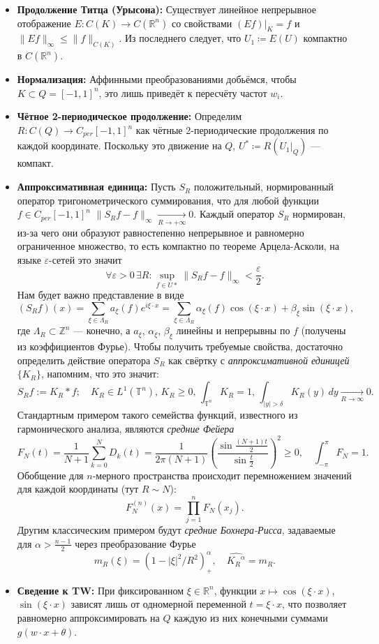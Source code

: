 \documentclass[../NDCNNAI_main.tex]{subfiles}
\begin{document}
\begin{itemize}
  \item \textbf{Продолжение Титца (Урысона):} Существует линейное непрерывное отображение $E\colon C(K) \to C(\mathbb{R}^n)$ со свойствами $(Ef)\big|_K = f$ и $\|Ef\|_\infty \le \|f\|_{C(K)}$.
  Из последнего следует, что $U_1 \coloneq E(U)$ компактно в $C(\mathbb{R}^n)$.
  \item \textbf{Нормализация:} Аффинными преобразованиями добьёмся, чтобы $K \subset Q = [-1, 1]^n$, это лишь приведёт к пересчёту частот $w_i$.
  \item \textbf{Чётное 2-периодическое продолжение:} Определим $R\colon C(Q) \to C_{per}[-1, 1]^n$ как чётные 2-периодические продолжения по каждой координате.
  Поскольку это движение на $Q$, $U^* \coloneq R(U_1\big|_Q)$ --- компакт.
  \item \textbf{Аппроксимативная единица:} Пусть $S_R$ положительный, нормированный оператор тригонометрического суммирования, что для любой функции $f \in C_{per}[-1, 1]^n$ $\|S_Rf - f\|_\infty \xrightarrow[R \to +\infty]{} 0$.
  Каждый оператор $S_R$ нормирован, из-за чего они образуют равностепенно непрерывное и равномерно ограниченное множество, то есть компактно по теореме Арцела-Асколи, на языке $\varepsilon$-сетей это значит
  $$\forall \varepsilon > 0\,\exists R\colon \sup_{f \in U*}\|S_Rf - f\|_\infty < \frac{\varepsilon}{2}.$$
  Нам будет важно представление в виде
  $$(S_Rf)(x) = \sum_{\xi \in \Lambda_R}a_\xi(f)e^{i\xi \cdot x} = \sum_{\xi \in \Lambda_R}\alpha_\xi(f)\cos(\xi \cdot x) + \beta_\xi\sin(\xi \cdot x),$$
  где $\Lambda_R\subset\mathbb{Z}^n$ --- конечно, а $a_\xi$, $\alpha_\xi$, $\beta_\xi$ линейны и непрерывны по $f$ (получены из коэффициентов Фурье).
  Чтобы получить требуемые свойства, достаточно определить действие оператора $S_R$ как свёртку с \emph{аппроксимативной единицей} $\{K_R\}$, напомним, что это значит:
  $$S_Rf := K_R * f; \quad K_R \in L^1(\mathbb{T}^n), \, K_R \ge 0, \, \int_{\mathbb{T}^n} K_R = 1, \, \int_{|y|>\delta} K_R(y) \, dy \xrightarrow[R \to \infty]{} 0.$$
  Стандартным примером такого семейства функций, известного из гармонического анализа, являются \emph{средние Фейера}
  $$F_N(t) = \frac{1}{N+1} \sum_{k=0}^{N} D_k(t) = \frac{1}{2\pi(N+1)} \left(\frac{\sin \frac{(N+1)t}{2}}{\sin \frac{t}{2}}\right)^2 \ge 0, \quad \int_{-\pi}^{\pi} F_N = 1.$$
  Обобщение для $n$-мерного пространства происходит перемножением значений для каждой координаты (тут $R \sim N$):
  $$F_N^{(n)}(x) = \prod_{j=1}^n F_N(x_j).$$
  Другим классическим примером будут \emph{средние Бохнера-Рисса}, задаваемые для $\alpha > \frac{n-1}{2}$ через преобразование Фурье
  $$m_R(\xi) = (1 - |\xi|^2 / R^2)_{+}^{\alpha}, \quad \widehat{{K_R}^\alpha} = m_R.$$
  \item \textbf{Сведение к TW:} При фиксированном $\xi \in \mathbb{R}^n$, функции $x \mapsto \cos(\xi \cdot x)$, $\sin({\xi \cdot x})$ зависят лишь от одномерной переменной $t = \xi \cdot x$, что позволяет равномерно аппроксимировать на $Q$ каждую из них конечными суммами $g(w \cdot x + \theta)$.
\end{itemize}
\end{document}
